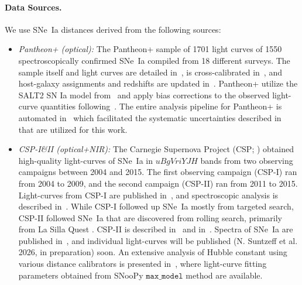 \paragraph{Data Sources.}
We use SNe~Ia distances derived from the following sources:
\begin{itemize}
    \item \textit{Pantheon+ (optical):} 
    The Pantheon+ sample of 1701 light curves of 1550 spectroscopically confirmed SNe~Ia compiled from 18 different surveys. The sample itself and light curves are detailed in~\cite{2022ApJ...938..113S}, is cross-calibrated in~\cite{2022ApJ...938..111B}, and host-galaxy assignments and redshifts are updated in~\cite{2022PASA...39...46C}. Pantheon+ utilize the SALT2 SN Ia model from~\cite{2021MNRAS.504.4111T} and apply bias corrections to the observed light-curve quantities following~\cite{p21,p22}. The entire analysis pipeline for Pantheon+ is automated in~\cite{Hinton:2020yik} which facilitated the systematic uncertainties described in~\cite{2022ApJ...938..110B} that are utilized for this work. 
   
    \item \textit{CSP-I\&II (optical+NIR):} The Carnegie Supernova Project (CSP; \citealt{2006PASP..118....2H}) obtained high-quality light-curves of SNe~Ia in $uBgVriYJH$ bands from two observing campaigns between 2004 and 2015. The first observing campaign (CSP-I) ran from 2004 to 2009, and the second campaign (CSP-II) ran from 2011 to 2015. Light-curves from CSP-I are published in~\cite{2017AJ....154..211K}, and spectroscopic analysis is described in~\cite{2013ApJ...773...53F}. While CSP-I followed up SNe~Ia mostly from targeted search, CSP-II followed SNe~Ia that are discovered from rolling search, primarily from La Silla Quest \citep{2013PASP..125..683B}. CSP-II is described in~\cite{2019PASP..131a4002H} and in~\cite{2019PASP..131a4001P}. Spectra of SNe~Ia are published in~\cite{2024ApJ...967...20M}, and individual light-curves will be published (N. Suntzeff et al. 2026, in preparation) soon. An extensive analysis of Hubble constant using various distance calibrators is presented in~\cite{2024ApJ...970...72U}, where light-curve fitting parameters obtained from SNooPy \citep{2011AJ....141...19B} $\texttt{max\_model}$ method are available. 
    

\end{itemize}
